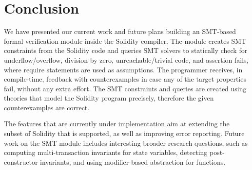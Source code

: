 \section{Conclusion}
\label{section:conclusion}
We have presented our current work and future plans building an SMT-based
formal verification module inside the Solidity compiler.
%
The module creates SMT constraints from the Solidity code and queries SMT
solvers to statically check for underflow/overflow, division by zero,
unreachable/trivial code, and assertion fails, where require statements are
used as assumptions.
%
The programmer receives, in compile-time, feedback with counterexamples in case
any of the target properties fail, without any extra effort.
%
The SMT constraints and queries are created using theories that model the
Solidity program precisely, therefore the given counterexamples are correct.

The features that are currently under implementation aim at extending the
subset of Solidity that is supported, as well as improving error reporting.
%
Future work on the SMT module includes interesting broader research questions,
such as computing multi-transaction invariants for state variables, detecting
post-constructor invariants, and using modifier-based abstraction for
functions.

